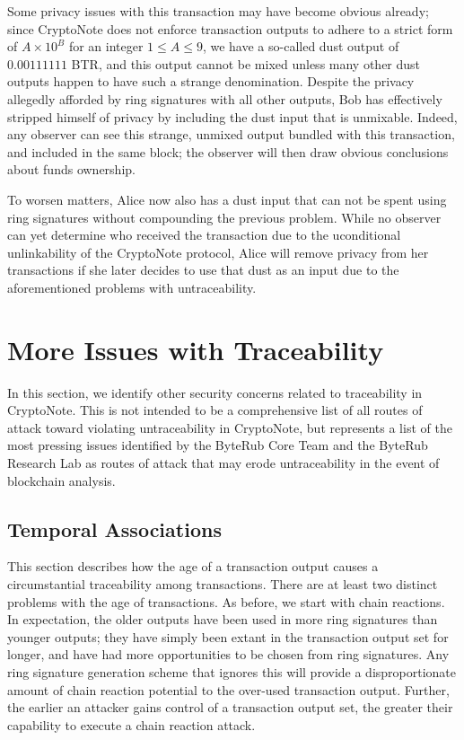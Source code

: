 \documentclass[12pt,english]{mrl}
\theoremstyle{definition}
\renewcommand{\leq}{\leqslant}
\numberwithin{equation}{section}
\numberwithin{figure}{section}
\numberwithin{equation}{section}
\numberwithin{equation}{section}
\numberwithin{figure}{section}
\begin{document}
Some privacy issues with this transaction may have become obvious already; since CryptoNote does not enforce transaction outputs to adhere to a strict form of $A \times 10^{B}$ for an integer $1 \leq A \leq 9$, we have a so-called dust output of $0.00111111$ BTR, and this output cannot be mixed unless many other dust outputs happen to have such a strange denomination. Despite the privacy allegedly afforded by ring signatures with all other outputs, Bob has effectively stripped himself of privacy by including the dust input that is unmixable. Indeed, any observer can see this strange, unmixed output bundled with this transaction, and included in the same block; the observer will then draw obvious conclusions about funds ownership.

To worsen matters, Alice now also has a dust input that can not be spent using ring signatures without compounding the previous problem. While no observer can yet determine who received the transaction due to the uconditional unlinkability of the CryptoNote protocol, Alice will remove privacy from her transactions if she later decides to use that dust as an input due to the aforementioned problems with untraceability.

\section{More Issues with Traceability}\label{moreIssues}
In this section, we identify other security concerns related to traceability in CryptoNote. This is not intended to be a comprehensive list of all routes of attack toward violating untraceability in CryptoNote, but represents a list of the most pressing issues identified by the ByteRub Core Team and the ByteRub Research Lab as routes of attack that may erode untraceability in the event of blockchain analysis.

\subsection{Temporal Associations}\label{temporalAssociations}

This section describes how the age of a transaction output causes a circumstantial traceability among transactions. There are at least two distinct problems with the age of transactions. As before, we start with chain reactions. In expectation, the older outputs have been used in more ring signatures than younger outputs; they have simply been extant in the transaction output set for longer, and have had more opportunities to be chosen from ring signatures. Any ring signature generation scheme that ignores this will provide a disproportionate amount of chain reaction potential to the over-used transaction output. Further, the earlier an attacker gains control of a transaction output set, the greater their capability to execute a chain reaction attack.
\end{document}

